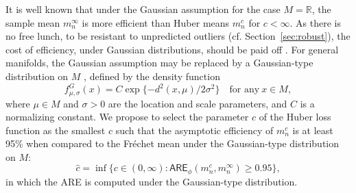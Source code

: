 \documentclass[preprint]{imsart}
\theoremstyle{plain}
\newtheorem{proposition}{Proposition}
\theoremstyle{remark}
\begin{document}
It is well known that under the Gaussian assumption for the case $M = \mathbb{R}$, the sample mean $m_n^\infty$ is more efficient than Huber means $m_n^c$ for $c<\infty$. As there is no free lunch, to be resistant to unpredicted outliers (cf. Section~\ref{sec:robust}), the cost of efficiency, under Gaussian distributions, should be paid off \citep{huber2004robust}.
%
For general manifolds, the Gaussian assumption may be replaced by a Gaussian-type distribution on $M$ \citep{pennec2006intrinsic, said2022gaussian}, defined by the density function %
\begin{equation}\label{eq:Gaussian-type_distn}
f^{G}_{\mu, \sigma}(x) = C\exp\{-d^2(x, \mu)/2\sigma^2\} \quad \mbox{for any} ~ x \in M,
\end{equation}
where $\mu \in M$ and $\sigma>0$ are the location and scale parameters, and $C$ is a normalizing constant. %
We propose to select the parameter $c$ of the Huber loss function as the smallest $c$ such that the asymptotic efficiency of $m_n^c$ is at least 95\% when compared to the Fr\'{e}chet mean under the Gaussian-type distribution on $M$:
%
%
\begin{equation}\label{eq:c_hat}
    \hat{c} = \inf\{c \in (0, \infty): \textsf{ARE}_{\phi}(m^{c}_{n}, m^{\infty}_{n}) \ge 0.95\},
\end{equation}
in which the ARE is computed under the Gaussian-type distribution. %
\end{document}
